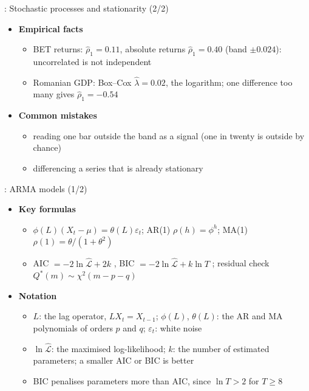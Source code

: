\begin{frame}{: Stochastic processes and stationarity (2/2)}
\itemsize{\footnotesize}
\begin{itemize}
    \item \textbf{Empirical facts}
    \begin{itemize}
        \item BET returns: $\hat\rho_1 = 0.11$, absolute returns $\hat\rho_1 = 0.40$ (band $\pm 0.024$): uncorrelated is not independent
        \item Romanian GDP: Box--Cox $\hat\lambda = 0.02$, the logarithm; one difference too many gives $\hat\rho_1 = \ensuremath{-}0.54$
    \end{itemize}
    \item \textbf{Common mistakes}
    \begin{itemize}
        \item reading one bar outside the band as a signal (one in twenty is outside by chance)
        \item differencing a series that is already stationary
    \end{itemize}
\end{itemize}
\end{frame}

\begin{frame}{: ARMA models (1/2)}
\itemsize{\footnotesize}
\begin{itemize}
    \item \textbf{Key formulas}
    \begin{itemize}
        \item $\phi(L)(X_t - \mu) = \theta(L)\varepsilon_t$; AR(1) $\rho(h) = \phi^h$; MA(1) $\rho(1) = \theta/(1 + \theta^2)$
        \item AIC $= -2\ln\hat{\mathcal{L}} + 2k$ , BIC $= -2\ln\hat{\mathcal{L}} + k\ln T$ ; residual check $Q^*(m) \sim \chi^2(m - p - q)$
    \end{itemize}
    \item \textbf{Notation}
    \begin{itemize}
        \item $L$: the lag operator, $LX_t = X_{t-1}$; $\phi(L)$, $\theta(L)$: the AR and MA polynomials of orders $p$ and $q$; $\varepsilon_t$: white noise
        \item $\ln\hat{\mathcal{L}}$: the maximised log-likelihood; $k$: the number of estimated parameters; a smaller AIC or BIC is better
        \item BIC penalises parameters more than AIC, since $\ln T > 2$ for $T \ge 8$
    \end{itemize}
\end{itemize}
\end{frame}

